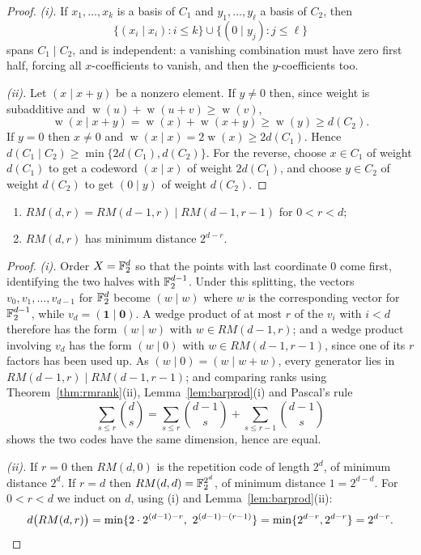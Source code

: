 \documentclass[a4paper]{scrartcl}
\DeclareMathOperator{\wt}{w}
\begin{document}
\begin{proof}
	\emph{(i).} If $x_1,\dots,x_k$ is a basis of $C_1$ and $y_1,\dots,y_\ell$ a basis of $C_2$, then
	$$\{(x_i\mid x_i) : i \le k\}\cup\{(0\mid y_j): j\le\ell\}$$
	spans $C_1\mid C_2$, and is independent: a vanishing combination must have zero first half, forcing all $x$-coefficients to vanish, and then the $y$-coefficients too.

	\emph{(ii).} Let $(x\mid x+y)$ be a nonzero element. If $y \ne 0$ then, since weight is subadditive and $\wt(u)+\wt(u+v)\ge\wt(v)$,
	$$\wt(x\mid x+y) = \wt(x)+\wt(x+y)\ge \wt(y)\ge d(C_2).$$
	If $y = 0$ then $x \ne 0$ and $\wt(x\mid x) = 2\wt(x)\ge 2d(C_1)$. Hence $d(C_1\mid C_2)\ge\min\{2d(C_1),d(C_2)\}$. For the reverse, choose $x\in C_1$ of weight $d(C_1)$ to get a codeword $(x\mid x)$ of weight $2d(C_1)$, and choose $y \in C_2$ of weight $d(C_2)$ to get $(0 \mid y)$ of weight $d(C_2)$.
\end{proof}

\begin{theorem}\label{thm:rmdist}
	\begin{enumerate}[label=(\roman*)]
		\item $RM(d,r) = RM(d-1,r)\mid RM(d-1,r-1)$ for $0 < r< d$;
		\item $RM(d,r)$ has minimum distance $2^{d-r}$.
	\end{enumerate}
\end{theorem}

\begin{proof}
	\emph{(i).} Order $X = \mathbb{F}_2^d$ so that the points with last coordinate $0$ come first, identifying the two halves with $\mathbb{F}_2^{d-1}$. Under this splitting, the vectors $v_0,v_1,\dots,v_{d-1}$ for $\mathbb{F}_2^d$ become $(w\mid w)$ where $w$ is the corresponding vector for $\mathbb{F}_2^{d-1}$, while $v_d = (\mathbf{1}\mid \mathbf 0)$. A wedge product of at most $r$ of the $v_i$ with $i<d$ therefore has the form $(w\mid w)$ with $w \in RM(d-1,r)$; and a wedge product involving $v_d$ has the form $(w\mid 0)$ with $w \in RM(d-1,r-1)$, since one of its $r$ factors has been used up. As $(w \mid 0) = (w \mid w + w)$, every generator lies in $RM(d-1,r)\mid RM(d-1,r-1)$; and comparing ranks using Theorem~\ref{thm:rmrank}(ii), Lemma~\ref{lem:barprod}(i) and Pascal's rule
	$$\sum_{s\le r}\binom ds = \sum_{s \le r}\binom{d-1}{s} + \sum_{s\le r-1}\binom{d-1}{s}$$
	shows the two codes have the same dimension, hence are equal.

	\emph{(ii).} If $r=0$ then $RM(d,0)$ is the repetition code of length $2^d$, of minimum distance $2^d$. If $r=d$ then $RM(d,d) = \mathbb{F}_2^{2^d}$, of minimum distance $1 = 2^{d-d}$. For $0<r<d$ we induct on $d$, using (i) and Lemma~\ref{lem:barprod}(ii):
	$$d\bigl(RM(d,r)\bigr) = \min\{2\cdot2^{(d-1)-r},\ 2^{(d-1)-(r-1)}\} = \min\{2^{d-r},2^{d-r}\} = 2^{d-r}. \qedhere$$
\end{proof}
\end{document}
